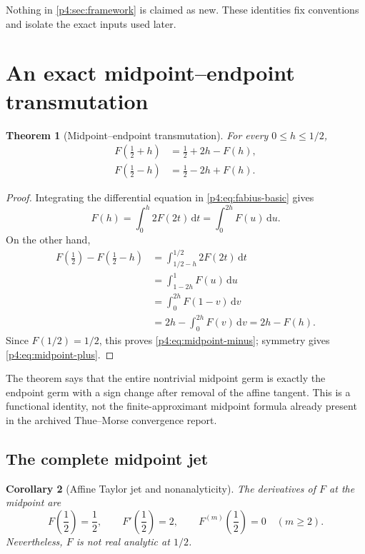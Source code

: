 \documentclass[11pt]{article}
\numberwithin{equation}{section}
\newtheorem{theorem}{Theorem}[section]
\newtheorem{corollary}[theorem]{Corollary}
\theoremstyle{definition}
\theoremstyle{remark}
\newcommand{\dd}{\,\mathrm d}
\begin{document}
\begin{establishedinputbox}
Nothing in \cref{p4:sec:framework} is claimed as new.  These identities fix conventions and isolate the exact inputs used later.
\end{establishedinputbox}

\section{An exact midpoint--endpoint transmutation}
\label{p4:sec:midpoint}

\begin{theorem}[Midpoint--endpoint transmutation]
\label{p4:thm:midpoint-transmutation}
For every $0\le h\le1/2$,
\begin{align}
 F\!\left(\frac12+h\right)&=\frac12+2h-F(h),
 \label{p4:eq:midpoint-plus}\\
 F\!\left(\frac12-h\right)&=\frac12-2h+F(h).
 \label{p4:eq:midpoint-minus}
\end{align}
\end{theorem}

\begin{proof}
Integrating the differential equation in \eqref{p4:eq:fabius-basic} gives
\begin{equation}
 F(h)=\int_0^h2F(2t)\dd t=\int_0^{2h}F(u)\dd u.
 \label{p4:eq:F-integral}
\end{equation}
On the other hand,
\begin{align*}
 F\!\left(\frac12\right)-F\!\left(\frac12-h\right)
 &=\int_{1/2-h}^{1/2}2F(2t)\dd t\\
 &=\int_{1-2h}^{1}F(u)\dd u\\
 &=\int_0^{2h}F(1-v)\dd v\\
 &=2h-\int_0^{2h}F(v)\dd v
 =2h-F(h).
\end{align*}
Since $F(1/2)=1/2$, this proves \eqref{p4:eq:midpoint-minus}; symmetry gives \eqref{p4:eq:midpoint-plus}.
\end{proof}

\begin{corpusdeductionbox}
The theorem says that the entire nontrivial midpoint germ is exactly the endpoint germ with a sign change after removal of the affine tangent.  This is a functional identity, not the finite-approximant midpoint formula already present in the archived Thue--Morse convergence report.
\end{corpusdeductionbox}

\subsection{The complete midpoint jet}
\begin{corollary}[Affine Taylor jet and nonanalyticity]
\label{p4:cor:midpoint-jet}
The derivatives of $F$ at the midpoint are
\begin{equation}
 F\!\left(\frac12\right)=\frac12,
 \qquad F'\!\left(\frac12\right)=2,
 \qquad F^{(m)}\!\left(\frac12\right)=0\quad(m\ge2).
 \label{p4:eq:midpoint-jet}
\end{equation}
Nevertheless, $F$ is not real analytic at $1/2$.
\end{corollary}
\end{document}
